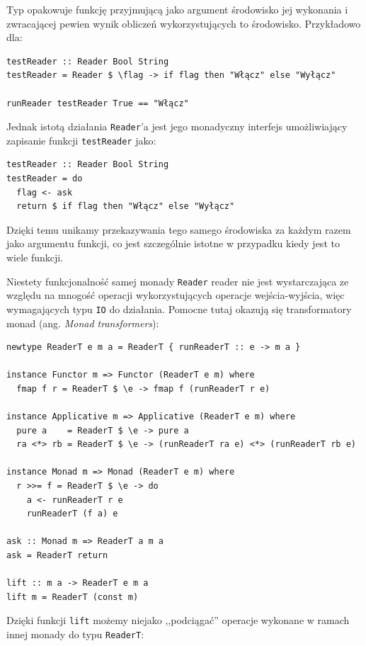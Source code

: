Typ  opakowuje funkcję przyjmującą jako argument środowisko jej wykonania i zwracającej pewien wynik obliczeń wykorzystujących to środowisko. Przykładowo dla:

\begin{lstlisting}
testReader :: Reader Bool String
testReader = Reader $ \flag -> if flag then "Włącz" else "Wyłącz"

runReader testReader True == "Włącz"
\end{lstlisting}

Jednak istotą działania \lstinline{Reader}'a jest jego monadyczny interfejs umożliwiający zapisanie funkcji \lstinline{testReader} jako:

\begin{lstlisting}
testReader :: Reader Bool String
testReader = do
  flag <- ask
  return $ if flag then "Włącz" else "Wyłącz"
\end{lstlisting}

Dzięki temu unikamy przekazywania tego samego środowiska za każdym razem jako argumentu funkcji, co jest szczególnie istotne w przypadku kiedy jest to wiele funkcji.

Niestety funkcjonalność samej monady \lstinline{Reader} reader nie jest wystarczająca ze względu na mnogość operacji wykorzystujących operacje wejścia-wyjścia, więc wymagających typu \lstinline{IO} do działania. Pomocne tutaj okazują się transformatory monad (ang. \textit{Monad transformers}\cite{Transformers}):

\begin{lstlisting}[caption=Transformator typu Reader]
newtype ReaderT e m a = ReaderT { runReaderT :: e -> m a }

instance Functor m => Functor (ReaderT e m) where
  fmap f r = ReaderT $ \e -> fmap f (runReaderT r e)

instance Applicative m => Applicative (ReaderT e m) where
  pure a    = ReaderT $ \e -> pure a
  ra <*> rb = ReaderT $ \e -> (runReaderT ra e) <*> (runReaderT rb e)

instance Monad m => Monad (ReaderT e m) where 
  r >>= f = ReaderT $ \e -> do
    a <- runReaderT r e
    runReaderT (f a) e

ask :: Monad m => ReaderT a m a
ask = ReaderT return

lift :: m a -> ReaderT e m a
lift m = ReaderT (const m)
\end{lstlisting}
Dzięki funkcji \lstinline{lift} możemy niejako ,,podciągać'' operacje wykonane w ramach innej monady do typu \lstinline{ReaderT}:


